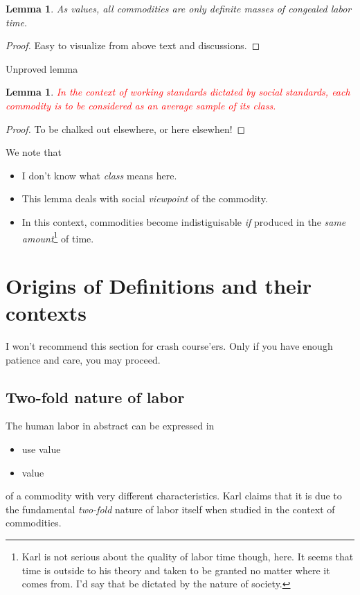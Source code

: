 \documentclass[12pt]{extarticle}
\newtheorem{lemma}[theorem]{Lemma}
\theoremstyle{definition}
\newenvironment{remark}[1][Remark]{\begin{trivlist}
\item[\hskip \labelsep {\bfseries #1}]}{\end{trivlist}}
\begin{document}
        \begin{lemma}
          As values, all commodities are only definite masses of congealed labor time.
        \end{lemma}
        \begin{proof}
          Easy to visualize from above text and discussions.
        \end{proof}

        Unproved lemma
        \begin{lemma}
          \label{lem:comclass}
          \textcolor{red}{In the context of working standards dictated by social standards, each commodity is to be considered as an average sample of its class.}
        \end{lemma}
        \begin{proof}
          To be chalked out elsewhere, or here elsewhen!
        \end{proof}
        \begin{remark}
          \label{rem:comclass}
          We note that
          \begin{itemize}
          \item I don't know what \emph{class} means here.
          \item This lemma deals with social \emph{viewpoint} of the commodity.
            \item In this context, commodities become indistiguisable \emph{if} produced in the \emph{same amount}\footnote{Karl is not serious about the quality of labor time though, here.  It seems that time is outside to his theory and taken to be granted no matter where it comes from.  I'd say that be dictated by the nature of society.} of time.
          \end{itemize}
        \end{remark}

\section{Origins of Definitions and their contexts}
I won't recommend this section for crash course'ers.  Only if you have enough patience and care, you may proceed.
\subsection{Two-fold nature of labor}
The human labor in abstract can be expressed in
\begin{itemize}
\item use value
\item value
\end{itemize}
of a commodity with very different characteristics.  Karl claims that it is due to the fundamental \emph{two-fold} nature of labor itself when studied in the context of commodities.
\end{document}
